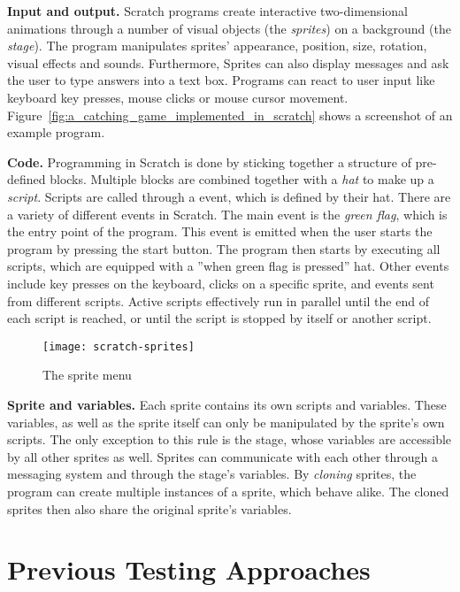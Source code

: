 \textbf{Input and output.}
Scratch programs create interactive two-dimensional animations through a number of visual objects (the \textit{sprites}) on a background (the \textit{stage}).
The program manipulates sprites' appearance, position, size, rotation, visual effects and sounds.
Furthermore, Sprites can also display messages and ask the user to type answers into a text box.
Programs can react to user input like keyboard key presses, mouse clicks or mouse cursor movement.
Figure~\ref{fig:a_catching_game_implemented_in_scratch} shows a screenshot of an example program.
\parspace

\textbf{Code.}
Programming in Scratch is done by sticking together a structure of pre-defined blocks.
Multiple blocks are combined together with a \textit{hat} to make up a \textit{script}.
Scripts are called through a event, which is defined by their hat. %
There are a variety of different events in Scratch.
The main event is the \textit{green flag}, which is the entry point of the program.
This event is emitted when the user starts the program by pressing the start button.
The program then starts by executing all scripts, which are equipped with a ''when green flag is pressed'' hat.
Other events include key presses on the keyboard, clicks on a specific sprite, and events sent from different scripts.
Active scripts effectively run in parallel until the end of each script is reached, or until the script is stopped by itself or another script.
\parspace

\begin{wrapfigure}{r}{0.45\textwidth + 5mm}
    \centering
    \vspace{-4mm}
    \texttt{[image: scratch-sprites]}
    \caption{The sprite menu}
    \label{fig:the_sprite_menu}
\end{wrapfigure}
\textbf{Sprite and variables.}
Each sprite contains its own scripts and variables.
These variables, as well as the sprite itself can only be manipulated by the sprite's own scripts.
The only exception to this rule is the stage, whose variables are accessible by all other sprites as well.
Sprites can communicate with each other through a messaging system and through the stage's variables.
By \textit{cloning} sprites, the program can create multiple instances of a sprite, which behave alike.
The cloned sprites then also share the original sprite's variables.

\section{Previous Testing Approaches}%
\label{sec:previous_testing_approaches}

